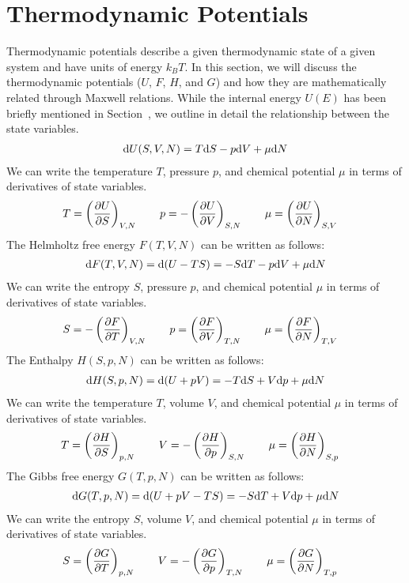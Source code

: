 \section{Thermodynamic Potentials}\label{potentials}
Thermodynamic potentials describe a given thermodynamic state of a given system
and have units of energy $k_BT$. In this section, we will discuss the
thermodynamic potentials ($U$, $F$, $H$, and $G$) and how they are mathematically related through
Maxwell relations. While the internal energy $U(E)$ has been briefly mentioned
in Section~, we outline in detail the relationship between the state
variables.
\begin{align}
    \text{d}U(S,V,N) = T\text{d}S-p\text{d}V+\mu\text{d}N
\end{align}
We can write the temperature $T$, pressure $p$, and chemical potential $\mu$ in terms of derivatives of state variables.
\begin{align}\label{maxU}
    T = \left( \pdv{U}{S}\right )_{V,N}  \quad\quad 
    p = -\left( \pdv{U}{V}\right )_{S,N}  \quad\quad 
    \mu = \left( \pdv{U}{N}\right )_{S,V}  \quad
\end{align}
The Helmholtz free energy $F(T,V,N)$ can be written as follows:
\begin{align}
    \text{d}F(T,V,N) = \text{d}(U-TS) = -S\text{d}T-p\text{d}V+\mu\text{d}N
\end{align}
We can write the entropy $S$, pressure $p$, and chemical potential $\mu$ in terms of derivatives of state variables.
\begin{align}\label{maxF}
    S = -\left( \pdv{F}{T}\right )_{V,N}  \quad\quad 
    p = \left( \pdv{F}{V}\right )_{T,N}  \quad\quad 
    \mu = \left( \pdv{F}{N}\right )_{T,V}  \quad
\end{align}
The Enthalpy $H(S,p,N)$ can be written as follows:
\begin{align}
    \text{d}H(S,p,N) = \text{d}(U+pV) = -T\text{d}S+V\text{d}p+\mu\text{d}N
\end{align}
We can write the temperature $T$, volume $V$, and chemical potential $\mu$ in terms of derivatives of state variables.
\begin{align}\label{maxH}
    T = \left( \pdv{H}{S}\right )_{p,N}  \quad\quad 
    V = -\left( \pdv{H}{p}\right )_{S,N}  \quad\quad 
    \mu = \left( \pdv{H}{N}\right )_{S,p}  \quad
\end{align}
The Gibbs free energy $G(T,p,N)$ can be written as follows:
\begin{align}
    \text{d}G(T,p,N) = \text{d}(U+pV-TS) = -S\text{d}T+V\text{d}p+\mu\text{d}N
\end{align}
We can write the entropy $S$, volume $V$, and chemical potential $\mu$ in terms of derivatives of state variables.
\begin{align}\label{maxG}
    S = \left( \pdv{G}{T}\right )_{p,N}  \quad\quad 
    V = -\left( \pdv{G}{p}\right )_{T,N}  \quad\quad 
    \mu = \left( \pdv{G}{N}\right )_{T,p}  \quad
\end{align}

